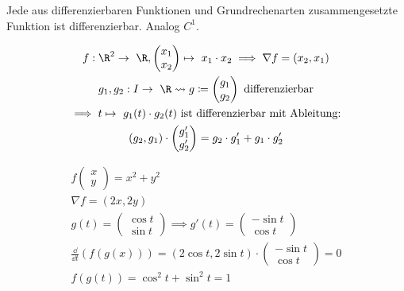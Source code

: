 \begin{folge}
	Jede aus differenzierbaren Funktionen und Grundrechenarten zusammengesetzte Funktion ist differenzierbar. Analog $C^1$.
\end{folge}
\begin{bsp*}
	\begin{gather*}
		f: \R^2 \rightarrow \R , \begin{pmatrix} x_1 \\ x_2 \end{pmatrix} \mapsto x_1 \cdot x_2 \implies \nabla f = (x_2 , x_1) \\
		g_1 , g_2 : I \rightarrow \R \rightsquigarrow g \coloneqq \begin{pmatrix} g_1 \\ g_2 \end{pmatrix} \text{ differenzierbar} \\
		\implies t \mapsto g_1(t) \cdot g_2(t) \text{ ist differenzierbar mit Ableitung:} \\
		(g_2 , g_1) \cdot \begin{pmatrix} g_1' \\ g_2' \end{pmatrix} = g_2 \cdot g_1' + g_1 \cdot g_2'
	\end{gather*}
\end{bsp*}
\begin{bsp*}
	\begin{gather*}
		f \begin{pmatrix} x \\ y \end{pmatrix} = x^2 + y^2 \\
		\nabla f = (2x , 2y) \\
		g(t) = \begin{pmatrix} \cos t \\ \sin t \end{pmatrix} \implies g'(t) = \begin{pmatrix} -\sin t \\ \cos t \end{pmatrix} \\
		\frac{\dd}{\dd t}(f(g(x))) = (2\cos t , 2\sin t) \cdot \begin{pmatrix} -\sin t \\ \cos t \end{pmatrix} = 0 \\
		f(g(t)) = \cos^2 t + \sin^2 t = 1
	\end{gather*}
\end{bsp*}
